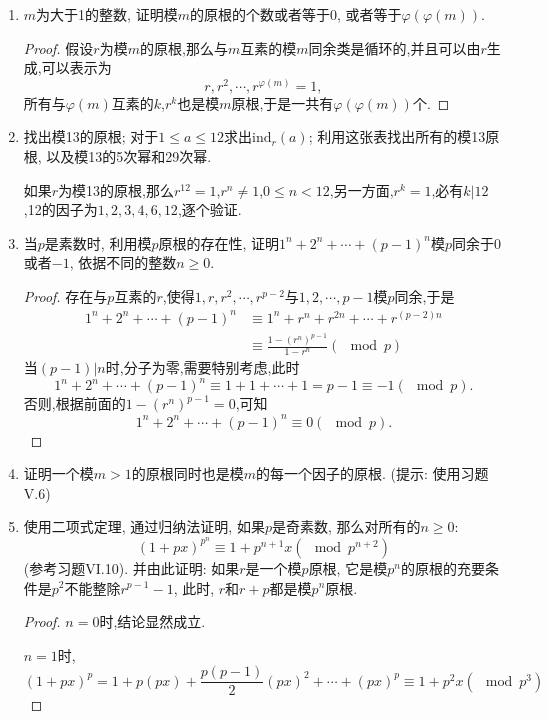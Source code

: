 \documentclass[12pt,a4paper]{book} %
\theoremstyle{remark}
\theoremstyle{example}
\theoremstyle{lemma}
\theoremstyle{corollary}
\numberwithin{theorem}{chapter}
\begin{document}
\begin{enumerate}
\item $m$为大于1的整数, 证明模$m$的原根的个数或者等于0, 或者等于$\varphi(\varphi(m))$.

\begin{proof}
假设$r$为模$m$的原根,那么与$m$互素的模$m$同余类是循环的,并且可以由$r$生成,可以表示为
\[
r,r^2,\cdots,r^{\varphi(m)}=1,
\]
所有与$\varphi(m)$互素的$k$,$r^k$也是模$m$原根,于是一共有$\varphi(\varphi(m))$个.
\end{proof}

\item 找出模13的原根; 对于$1 \le a  \le 12$求出$\text{ind}_r(a)$; 利用这张表找出所有的模13原根, 以及模13的5次幂和29次幂.

如果$r$为模13的原根,那么$r^{12}=1$,$r^n \neq 1$,$0 \le n<12$,另一方面,$r^k=1$,必有$k|12$,12的因子为$1,2,3,4,6,12$,逐个验证.

\item 当$p$是素数时, 利用模$p$原根的存在性, 证明$1^n + 2^n + \cdots + (p - 1)^n$模$p$同余于$0$或者$-1$, 依据不同的整数$n \ge 0$.

\begin{proof}
存在与$p$互素的$r$,使得$1,r,r^2,\cdots,r^{p-2}$与$1,2,\cdots,p-1$模$p$同余,于是
\[
\begin{aligned}
1^n + 2^n + \cdots + (p - 1)^n &\equiv 1^n+r^n+r^{2n}+\cdots + r^{(p-2)n}\\
&\equiv \frac{1-(r^n)^{p-1}}{1-r^n}(\mod{p})
\end{aligned}
\]
当$(p-1)|n$时,分子为零,需要特别考虑,此时
\[
1^n + 2^n + \cdots + (p - 1)^n \equiv 1 + 1 + \cdots + 1 = p-1 \equiv -1(\mod{p}).
\]
否则,根据前面的$1-(r^n)^{p-1}=0$,可知
\[
1^n + 2^n + \cdots + (p - 1)^n \equiv 0(\mod{p}).
\]
\end{proof}

\item 证明一个模$m > 1$的原根同时也是模$m$的每一个因子的原根. (提示: 使用习题V.6)

\item 使用二项式定理, 通过归纳法证明, 如果$p$是奇素数, 那么对所有的$n \ge 0$:
\[
(1 + px)^{p^n} \equiv 1 + p^{n + 1}x (\mod p^{n + 2})
\]
(参考习题VI.10). 并由此证明: 如果$r$是一个模$p$原根, 它是模$p^n$的原根的充要条件是$p^2$不能整除$r^{p - 1} - 1$, 此时, $r$和$r + p$都是模$p^n$原根.

\begin{proof}
$n=0$时,结论显然成立.

$n=1$时,
\[
(1 + px)^p = 1 + p(px) + \frac{p(p-1)}{2}(px)^2+ \cdots + (px)^p \equiv 1+p^2x(\mod{p^3})
\]


\end{proof}
\end{enumerate}
\end{document}
